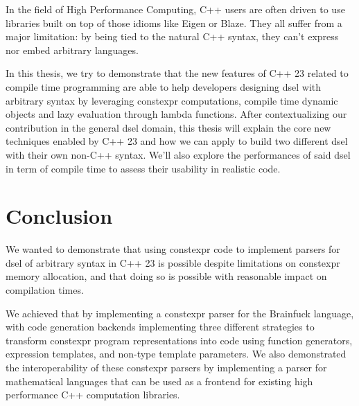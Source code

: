 \documentclass[english,12pt,a4paper]{book}
\providecommand{\cpp}{\textsc{C++}\xspace}
\begin{document}
In the field of High Performance Computing, \cpp users are often driven to use
libraries built on top of those idioms like Eigen\cite{eigen} or
Blaze\cite{blazelib,iglberger2012_2}. They all suffer from a major limitation:
by being tied to the natural \cpp syntax, they can't express nor embed arbitrary
languages.

In this thesis, we try to demonstrate that the new features of \cpp23 related to
compile time programming are able to help developers designing \acrshort{dsel}\acrpluralsuffix{} with
arbitrary syntax by leveraging \gls{constexpr} computations, compile time dynamic
objects and lazy evaluation through lambda functions. After contextualizing our
contribution in the general \acrshort{dsel}\acrpluralsuffix{} domain, this thesis will explain the core
new techniques enabled by \cpp23 and how we can apply to build two different
\acrshort{dsel}\acrpluralsuffix{} with their own non-\cpp syntax. We'll also explore the performances of
said \acrshort{dsel}\acrpluralsuffix{} in term of compile time to assess their usability in realistic code.






\section{Conclusion}


We wanted to demonstrate that using \gls{constexpr} code to implement parsers for
\acrshort{dsel} of arbitrary syntax in \cpp23 is possible despite limitations on
\gls{constexpr} memory allocation, and that doing so is possible with reasonable
impact on compilation times.

We achieved that by implementing a \gls{constexpr} parser for the Brainfuck language,
with code generation backends implementing three different strategies to
transform \gls{constexpr} program representations into code using function
generators, expression templates, and non-type template parameters.
We also demonstrated the interoperability of these \gls{constexpr} parsers by
implementing a parser for mathematical languages that can be used as a frontend
for existing high performance \cpp computation libraries.
\end{document}
